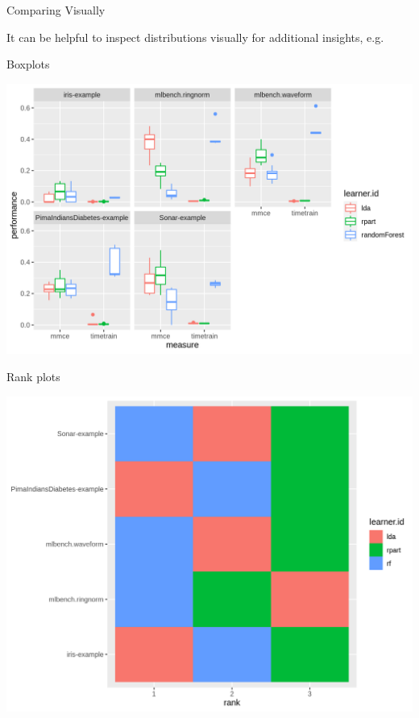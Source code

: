     \begin{frame}[c,allowframebreaks]{Comparing Visually}

    It can be helpful to inspect distributions visually for additional insights,
    e.g.\

    \bigskip
    Boxplots
    \begin{center}
        \includegraphics[height=.65\textheight]{multiple-boxplots}
    \end{center}

    \framebreak

    Rank plots
    \begin{center}
        \includegraphics[height=.7\textheight]{multiple-ranks}
    \end{center}

    \end{frame}


